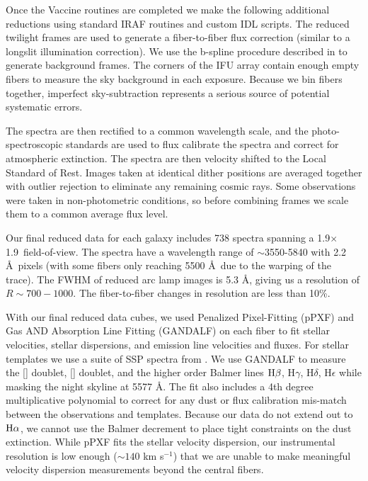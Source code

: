 \documentclass{emulateapj}
\newcommand\kms{km s$^{-1}$}
\newcommand\ha{$\rm{H}\alpha$}
\newcommand\hb{$\rm{H}\beta$}
\begin{document}
Once the Vaccine routines are completed we make the following additional reductions using standard IRAF routines and custom IDL scripts.  The reduced twilight frames are used to generate a fiber-to-fiber flux correction (similar to a longslit illumination correction).  We use the b-spline procedure described in \citet{Kelson03} to generate background frames.  The corners of the IFU array contain enough empty fibers to measure the sky background in each exposure.  Because we bin fibers together, imperfect sky-subtraction represents a serious source of potential systematic errors.  

The spectra are then rectified to a common wavelength scale, and the photo-spectroscopic standards are used to flux calibrate the spectra and correct for atmospheric extinction.  The spectra are then velocity shifted to the Local Standard of Rest.  Images taken at identical dither positions are averaged together with outlier rejection to eliminate any remaining cosmic rays.  Some observations were taken in non-photometric conditions, so before combining frames we scale them to a common average flux level.  

Our final reduced data for each galaxy includes 738 spectra spanning a 1.9\arcmin$\times$1.9\arcmin\ field-of-view.  The spectra have a wavelength range of $\sim$3550-5840 with 2.2 \AA\ pixels (with some fibers only reaching 5500 \AA\ due to the warping of the trace).  The FWHM of reduced arc lamp images is 5.3 \AA, giving us a resolution of $R\sim700-1000$.  The fiber-to-fiber changes in resolution are less than 10\%.  

With our final reduced data cubes, we used Penalized Pixel-Fitting (pPXF) \citep{Cappellari04} and Gas AND Absorption Line Fitting (GANDALF) \citep{Sarzi06} on each fiber to fit stellar velocities, stellar dispersions, and emission line velocities and fluxes.  For stellar templates we use a suite of SSP spectra from \citet{Bruzual03}.  We use GANDALF to measure the [] doublet, [] doublet, and the higher order Balmer lines \hb, H$\gamma$, H$\delta$, H$\epsilon$ while masking the night skyline at 5577 \AA.  The fit also includes a 4th degree multiplicative polynomial to correct for any dust or flux calibration mis-match between the observations and templates.  Because our data do not extend out to \ha, we cannot use the Balmer decrement to place tight constraints on the dust extinction.  While pPXF fits the stellar velocity dispersion, our instrumental resolution is low enough ($\sim140$ \kms) that we are unable to make meaningful velocity dispersion measurements beyond the central fibers.  
\end{document}
